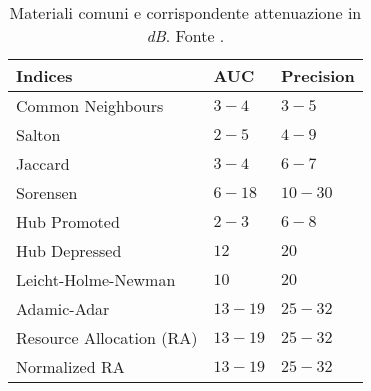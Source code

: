 \lipsum[1]

    \begin{table}[h]
		\centering
		\begin{tabular}{l l l}
		\toprule
		\textbf{Indices} & \textbf{AUC} & \textbf{Precision}\\
		\midrule
			Common Neighbours & $3-4$ & $3-5$\\
			Salton  & $2-5$ & $4-9$\\
			Jaccard & $3-4$ & $6-7$\\
			Sorensen  & $6-18$ & $10-30$\\
			Hub Promoted  & $2-3$ & $6-8$\\
			Hub Depressed & $12$ & $20$\\
			Leicht-Holme-Newman & $10$ & $20$\\
			Adamic-Adar & $13-19$ & $25-32$\\
			Resource Allocation (RA) & $13-19$ & $25-32$\\
			Normalized RA & $13-19$ & $25-32$\\
		\bottomrule
		\end{tabular}
		\label{tab:attenuazione}
		\caption{Materiali comuni e corrispondente attenuazione in \textit{dB}. Fonte \cite{Attenuazione}.}
	\end{table}
     



